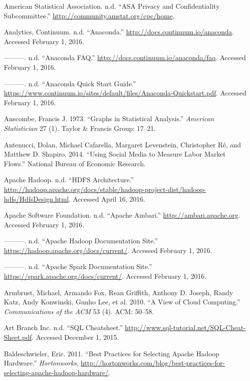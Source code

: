 \documentclass[]{krantz}
\begin{document}
\hypertarget{ref-AmericanStatisticalAssociation}{}
American Statistical Association. n.d. ``ASA Privacy and Confidentiality
Subcommittee.'' \url{http://community.amstat.org/cpc/home}.

\hypertarget{ref-Anaconda}{}
Analytics, Continuum. n.d. ``Anaconda.''
\url{http://docs.continuum.io/anaconda}. Accessed February 1, 2016.

\hypertarget{ref-AnacondaFAQ}{}
---------. n.d. ``Anaconda FAQ.''
\url{http://docs.continuum.io/anaconda/faq}. Accessed February 1, 2016.

\hypertarget{ref-AnacondaQSG}{}
---------. n.d. ``Anaconda Quick Start Guide.''
\url{https://www.continuum.io/sites/default/files/Anaconda-Quickstart.pdf}.
Accessed February 1, 2016.

\hypertarget{ref-anscombe1973graphs}{}
Anscombe, Francis J. 1973. ``Graphs in Statistical Analysis.''
\emph{American Statistician} 27 (1). Taylor \& Francis Group: 17--21.

\hypertarget{ref-antenucci2014using}{}
Antenucci, Dolan, Michael Cafarella, Margaret Levenstein, Christopher
Ré, and Matthew D. Shapiro. 2014. ``Using Social Media to Measure Labor
Market Flows.'' National Bureau of Economic Research.

\hypertarget{ref-HDFS}{}
Apache Hadoop. n.d. ``HDFS Architecture.''
\url{http://hadoop.apache.org/docs/stable/hadoop-project-dist/hadoop-hdfs/HdfsDesign.html}.
Accessed April 16, 2016.

\hypertarget{ref-ApacheAmbari}{}
Apache Software Foundation. n.d. ``Apache Ambari.''
\url{http://ambari.apache.org}. Accessed February 1, 2016.

\hypertarget{ref-AHweb}{}
---------. n.d. ``Apache Hadoop Documentation Site.''
\url{https://hadoop.apache.org/docs/current/}. Accessed February 1,
2016.

\hypertarget{ref-ASweb}{}
---------. n.d. ``Apache Spark Documentation Site.''
\url{https://spark.apache.org/docs/current/}. Accessed February 1, 2016.

\hypertarget{ref-armbrust2010view}{}
Armbrust, Michael, Armando Fox, Rean Griffith, Anthony D. Joseph, Randy
Katz, Andy Konwinski, Gunho Lee, et al. 2010. ``A View of Cloud
Computing.'' \emph{Communications of the ACM} 53 (4). ACM: 50--58.

\hypertarget{ref-SQLcheat}{}
Art Branch Inc. n.d. ``SQL Cheatsheet.''
\url{http://www.sql-tutorial.net/SQL-Cheat-Sheet.pdf}. Accessed December
1, 2015.

\hypertarget{ref-Provisioning}{}
Baldeschwieler, Eric. 2011. ``Best Practices for Selecting Apache Hadoop
Hardware.'' \emph{Hortonworks},
\url{http://hortonworks.com/blog/best-practices-for-selecting-apache-hadoop-hardware/}.
\end{document}
